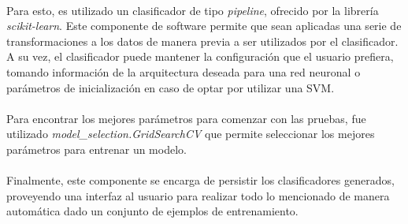\paragraph{} Para esto, es utilizado un clasificador de tipo \textit{pipeline}, ofrecido por la librería \textit{scikit-learn}. Este componente de software permite que sean aplicadas una serie de transformaciones a los datos de manera previa a ser utilizados por el clasificador. A su vez, el clasificador puede mantener la configuración que el usuario prefiera, tomando información de la arquitectura deseada para una red neuronal o parámetros de inicialización en caso de optar por utilizar una SVM. 


\paragraph{} Para encontrar los mejores parámetros para comenzar con las pruebas, fue utilizado \textit{model\_selection.GridSearchCV} que permite seleccionar los mejores parámetros para entrenar un modelo. 

\paragraph{} Finalmente, este componente se encarga de persistir los clasificadores generados, proveyendo una interfaz al usuario para realizar todo lo mencionado de manera automática dado un conjunto de ejemplos de entrenamiento.

